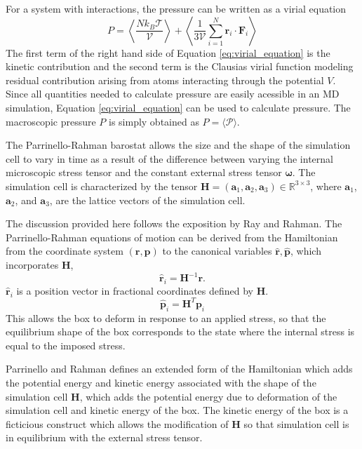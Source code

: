 For a system with interactions, the pressure can be written as a virial equation\cite{tadmor2011_md}
\begin{equation}
  \label{eq:virial_equation}
  P
	=
	\left\langle
	  \frac{N k_B \mathcal{T}}{\mathcal{V}}
  \right\rangle
  +
	\left\langle
	  \frac{1}
		     {3\mathcal{V}}
    \sum_{i=1}^N
        \bm{r}_i \cdot \bm{F}_{i}
	\right\rangle
\end{equation}
The first term of the right hand side of Equation \ref{eq:virial_equation} is the kinetic contribution and the second term is the Clausias virial function modeling residual contribution arising from atoms interacting through the potential $V$.  Since all quantities needed to calculate pressure are easily acessible in an MD simulation, Equation \ref{eq:virial_equation} can be used to calculate pressure.  The macroscopic pressure $P$ is simply obtained as $P=\langle \mathcal{P} \rangle$.

The Parrinello-Rahman barostat\cite{parrinello1980_barostat,parrinello1981_barostat} allows the size and the shape of the simulation cell to vary in time as a result of the difference between varying the internal microscopic stress tensor and the constant external stress tensor $\bm{\omega}$.  The simulation cell is characterized by the tensor $\bm{H}=(\bm{a}_1,\bm{a}_2,\bm{a}_3) \in \mathbb{R}^{3 \times 3}$, where $\bm{a}_1$, $\bm{a}_2$, and $\bm{a}_3$, are the lattice vectors of the simulation cell.

The discussion provided here follows the exposition by Ray and Rahman\cite{ray1984_npt}.  The Parrinello-Rahman equations of motion can be derived from the Hamiltonian from the coordinate system $(\bm{r},\bm{p})$ to the canonical variables $\hat{\bm{r}},\hat{\bm{p}}$, which incorporates $\bm{H}$,
\begin{equation}
  \hat{\bm{r}}_i = \bm{H}^{-1} \bm{r}.
\end{equation}
$\hat{\bm{r}}_i$ is a position vector in fractional coordinates defined by $\bm{H}$.
\begin{equation}
  \hat{\bm{p}}_i = \bm{H}^T \bm{p}_i
\end{equation}
This allows the box to deform in response to an applied stress, so that the equilibrium shape of the box corresponds to the state where the internal stress is equal to the imposed stress.

Parrinello and Rahman defines an extended form of the Hamiltonian which adds the potential energy and kinetic energy associated with the shape of the simulation cell $\bm{H}$, which adds the potential energy due to deformation of the simulation cell and kinetic energy of the box.  The kinetic energy of the box is a ficticious construct which allows the modification of $\bm{H}$ so that simulation cell is in equilibrium with the external stress tensor.

